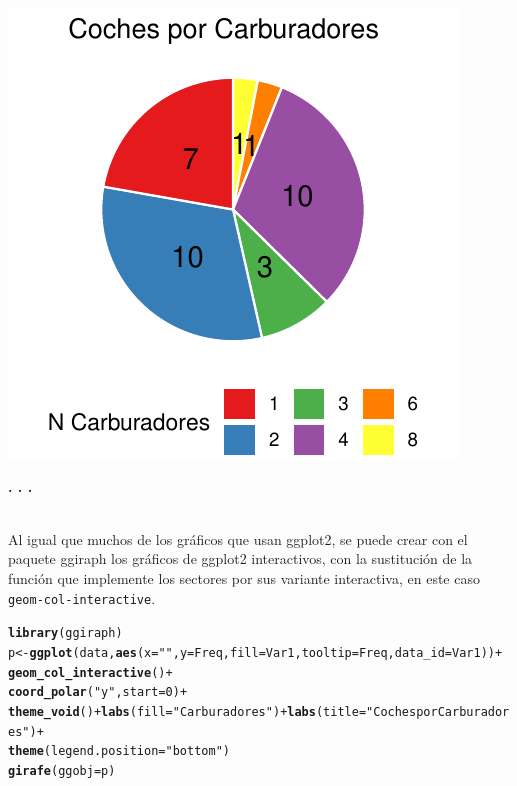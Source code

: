 \documentclass{article}\usepackage[]{graphicx}\usepackage[]{color}
\makeatletter
\def\maxwidth{ %
  \ifdim\Gin@nat@width>\linewidth
    \linewidth
  \else
    \Gin@nat@width
  \fi
}
\newcommand{\hlnum}[1]{\textcolor[rgb]{0.686,0.059,0.569}{#1}}%
\newcommand{\hlstr}[1]{\textcolor[rgb]{0.192,0.494,0.8}{#1}}%
\newcommand{\hlopt}[1]{\textcolor[rgb]{0,0,0}{#1}}%
\newcommand{\hlstd}[1]{\textcolor[rgb]{0.345,0.345,0.345}{#1}}%
\newcommand{\hlkwb}[1]{\textcolor[rgb]{0.69,0.353,0.396}{#1}}%
\newcommand{\hlkwc}[1]{\textcolor[rgb]{0.333,0.667,0.333}{#1}}%
\newcommand{\hlkwd}[1]{\textcolor[rgb]{0.737,0.353,0.396}{\textbf{#1}}}%
\newenvironment{kframe}{%
 \def\at@end@of@kframe{}%
 \ifinner\ifhmode%
  \def\at@end@of@kframe{\end{minipage}}%
  \begin{minipage}{\columnwidth}%
 \fi\fi%
 \def\FrameCommand##1{\hskip\@totalleftmargin \hskip-\fboxsep
 \colorbox{shadecolor}{##1}\hskip-\fboxsep
     \hskip-\linewidth \hskip-\@totalleftmargin \hskip\columnwidth}%
 \MakeFramed {\advance\hsize-\width
   \@totalleftmargin\z@ \linewidth\hsize
   \@setminipage}}%
 {\par\unskip\endMakeFramed%
 \at@end@of@kframe}
\newenvironment{knitrout}{}{} %
\makeatother
\begin{document}
\begin{knitrout}
\color{fgcolor}

{\centering \includegraphics[width=\maxwidth]{figure/plot_ggplot_pie-1} 

}



\end{knitrout}
\begin{center}
\textbf{. . .}
\end{center}
~\\
Al igual que muchos de los gr\'aficos que usan ggplot2, se puede crear con el paquete ggiraph\cite{docu_ggiraph} los gr\'aficos de ggplot2 interactivos, con la sustituci\'on de la funci\'on que implemente los sectores por sus variante interactiva, en este caso \texttt{geom-col-interactive}.
\begin{knitrout}
\color{fgcolor}\begin{kframe}
\begin{alltt}
\hlkwd{library}\hlstd{(ggiraph)}
\hlstd{p} \hlkwb{<-} \hlkwd{ggplot}\hlstd{(data,} \hlkwd{aes}\hlstd{(}\hlkwc{x}\hlstd{=}\hlstr{""}\hlstd{,} \hlkwc{y}\hlstd{=Freq,} \hlkwc{fill}\hlstd{=Var1,} \hlkwc{tooltip} \hlstd{= Freq,} \hlkwc{data_id} \hlstd{= Var1))} \hlopt{+}
  \hlkwd{geom_col_interactive}\hlstd{()} \hlopt{+}
  \hlkwd{coord_polar}\hlstd{(}\hlstr{"y"}\hlstd{,} \hlkwc{start}\hlstd{=}\hlnum{0}\hlstd{)} \hlopt{+}
  \hlkwd{theme_void}\hlstd{()} \hlopt{+} \hlkwd{labs}\hlstd{(}\hlkwc{fill}\hlstd{=}\hlstr{"Carburadores"}\hlstd{)}\hlopt{+}\hlkwd{labs}\hlstd{(}\hlkwc{title}\hlstd{=}\hlstr{"Coches por Carburadores"}\hlstd{)}\hlopt{+}
  \hlkwd{theme}\hlstd{(}\hlkwc{legend.position} \hlstd{=} \hlstr{"bottom"}\hlstd{)}
\hlkwd{girafe}\hlstd{(}\hlkwc{ggobj} \hlstd{= p)}
\end{alltt}
\end{kframe}
\end{knitrout}
\end{document}
